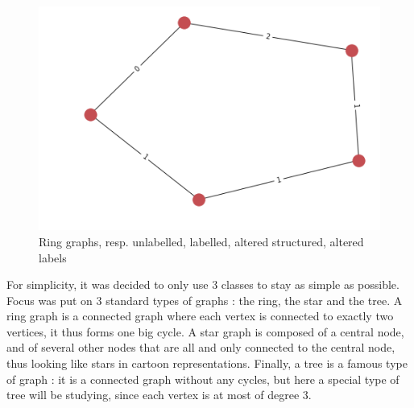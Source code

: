 \documentclass{article}
\theoremstyle{definition}
\begin{document}
\begin{figure}[!htb]
\begin{multicols}{4}
		\includegraphics[width=\linewidth]{data/generated-graphs/ring_altered_labels.png}\par
	\end{multicols}
	\caption{Ring graphs, resp. unlabelled, labelled, altered structured, altered labels}
\end{figure}
For simplicity, it was decided to only use 3 classes to stay as simple as possible. Focus was put on 3 standard types of graphs : the ring, the star and the tree. A ring graph is a connected graph where each vertex is connected to exactly two vertices, it thus forms one big cycle. A star graph is composed of a central node, and of several other nodes that are all and only connected to the central node, thus looking like stars in cartoon representations. Finally, a tree is a famous type of graph : it is a connected graph without any cycles, but here a special type of tree will be studying, since each vertex is at most of degree 3.
\end{document}
